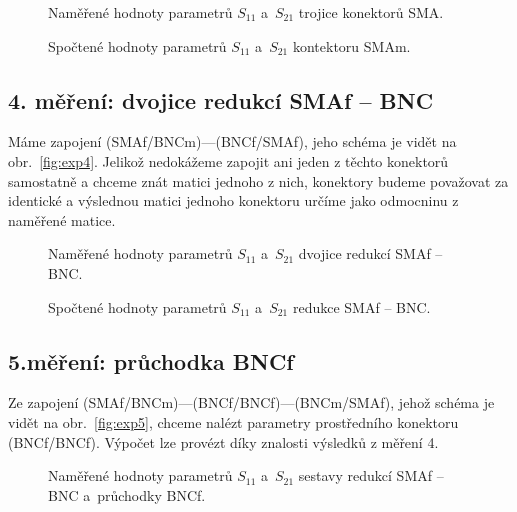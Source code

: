 \documentclass{protokol}
\newcommand\sparam{S}
\newcommand\male{m}
\newcommand\female{f}
\newcommand\connector[2]{#1 -- #2}
\begin{document}
\begin{figure}[htp]
	\centering
	
	
	\caption{Naměřené hodnoty parametrů $\sparam_{11}$ a~$\sparam_{21}$
		trojice konektorů SMA.}
	\label{fig:03-sparam}
\end{figure}

\begin{figure}[htp]
	\centering
	
	
	\caption{Spočtené hodnoty parametrů $\sparam_{11}$ a~$\sparam_{21}$
		kontektoru SMA\male.}
	\label{fig:03-result-sparam}
\end{figure}

\subsection{4. měření: dvojice redukcí \connector{SMA\female}{BNC}}
Máme zapojení (SMAf/BNCm)---(BNCf/SMAf),
jeho schéma je vidět na obr.~\ref{fig:exp4}.
Jelikož nedokážeme zapojit ani jeden z těchto konektorů samostatně
a chceme znát matici jednoho z nich,
konektory budeme považovat za identické a výslednou matici
jednoho konektoru určíme jako odmocninu z naměřené matice.

\begin{figure}[htp]
	\centering
	
	
	\caption{Naměřené hodnoty parametrů $\sparam_{11}$ a~$\sparam_{21}$
		dvojice redukcí \connector{SMA\female}{BNC}.}
	\label{fig:04-sparam}
\end{figure}

\begin{figure}[htp]
	\centering
	
	
	\caption{Spočtené hodnoty parametrů $\sparam_{11}$ a~$\sparam_{21}$
		redukce \connector{SMA\female}{BNC}.}
	\label{fig:04-result-sparam}
\end{figure}

\subsection{5.měření: průchodka BNC\female}
Ze zapojení (SMAf/BNCm)---(BNCf/BNCf)---(BNCm/SMAf),
jehož schéma je vidět na obr.~\ref{fig:exp5},
chceme nalézt parametry prostředního konektoru (BNCf/BNCf).
Výpočet lze provézt díky znalosti výsledků z měření 4.

\begin{figure}[htp]
	\centering
	
	
	\caption{Naměřené hodnoty parametrů $\sparam_{11}$ a~$\sparam_{21}$
		sestavy redukcí \connector{SMA\female}{BNC} a~průchodky BNC\female.}
	\label{fig:05-sparam}
\end{figure}
\end{document}
